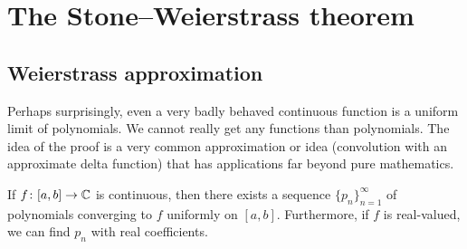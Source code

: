 
\sectionnewpage
\section{The Stone--Weierstrass theorem}
\label{sec:stoneweier}



\subsection{Weierstrass approximation}

Perhaps surprisingly, even a very badly behaved continuous function is
a uniform limit of polynomials.
We cannot really get any 
functions than polynomials.
The idea of the proof is a very common approximation or  idea
(convolution with an approximate delta function) that has applications
far beyond pure mathematics.

\begin{thm}
If $f \colon [a,b] \to {\mathbb{C}}$ is continuous, then there exists a sequence
$\{ p_n \}_{n=1}^\infty$ of polynomials converging to $f$ uniformly on $[a,b]$.
Furthermore, if $f$ is real-valued, we can find $p_n$ with real coefficients.
\end{thm}

